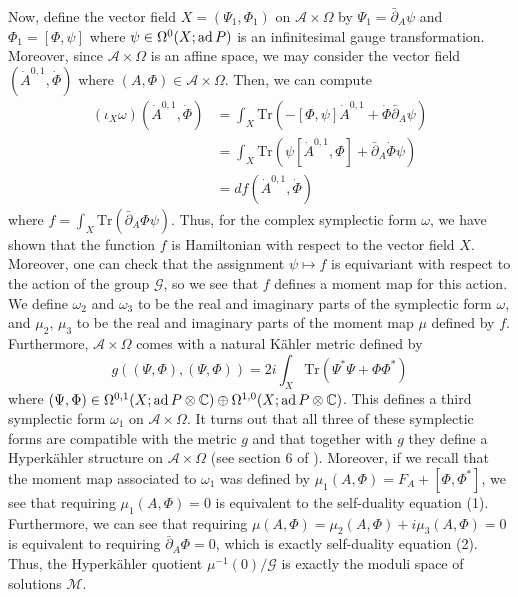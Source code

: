 Now, define the vector field $X = (\Psi_1,\Phi_1)$ on $\mathscr{A}\times \Omega$ by $\Psi_1 = \bar{\partial}_A\psi$ and $\Phi_1 = [\Phi,\psi]$ where $\psi\in \Omega^0(X;\mathrm{ad}\, P)$ is an infinitesimal gauge transformation. Moreover, since $\mathscr{A}\times \Omega$ is an affine space, we may consider the vector field $(\dot{A}^{0,1},\dot{\Phi})$ where $(A,\Phi)\in \mathscr{A}\times\Omega$. Then, we can compute
\begin{align*}
  (\iota_X\omega)(\dot{A}^{0,1},\dot{\Phi}) &= \int_X \mathrm{Tr}(-[\Phi,\psi]\dot{A}^{0,1} + \dot{\Phi}\bar{\partial}_A\psi) \\
&= \int_X \mathrm{Tr}(\psi[\dot{A}^{0,1},\Phi] + \bar{\partial}_A\dot{\Phi}\psi) \\
&= df(\dot{A}^{0,1},\dot{\Phi})
\end{align*}  
where $f = \int_X\mathrm{Tr}(\bar{\partial}_A\Phi\psi)$. Thus, for the complex symplectic form $\omega$, we have shown that the function $f$ is Hamiltonian with respect to the vector field $X$. Moreover, one can check that the assignment $\psi \mapsto f$ is equivariant with respect to the action of the group $\mathscr{G}$, so we see that $f$ defines a moment map for this action. We define $\omega_2$ and $\omega_3$ to be the real and imaginary parts of the symplectic form $\omega$, and $\mu_2$, $\mu_3$ to be the real and imaginary parts of the moment map $\mu$ defined by $f$. Furthermore, $\mathscr{A}\times\Omega$ comes with a natural K\"ahler metric defined by
\begin{equation*}
  g((\Psi,\Phi),(\Psi,\Phi)) = 2i\int_X\mathrm{Tr}(\Psi^*\Psi + \Phi\Phi^*)
\end{equation*}
where $(\Psi,\Phi)\in \Omega^{0,1}(X;\mathrm{ad}\, P\otimes \mathbb{C})\oplus \Omega^{1,0}(X;\mathrm{ad}\, P\otimes \mathbb{C})$. This defines a third symplectic form $\omega_1$ on $\mathscr{A}\times\Omega$. It turns out that all three of these symplectic forms are compatible with the metric $g$ and that together with $g$ they define a Hyperk\"ahler structure on $\mathscr{A}\times \Omega$ (see section 6 of \cite{H1}). Moreover, if we recall that the moment map associated to $\omega_1$ was defined by $\mu_1(A,\Phi) = F_A + [\Phi,\Phi^*]$, we see that requiring $\mu_1(A,\Phi) = 0$ is equivalent to the self-duality equation (1). Furthermore, we can see that requiring $\mu(A,\Phi) = \mu_2(A,\Phi) + i\mu_3(A,\Phi) = 0$ is equivalent to requiring $\bar{\partial}_A\Phi = 0$, which is exactly self-duality equation (2). Thus, the Hyperk\"ahler quotient $\mu^{-1}(0)/\mathscr{G}$ is exactly the moduli space of solutions $\mathcal{M}$. 

